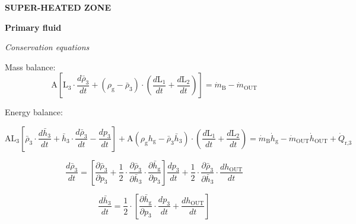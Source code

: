 \documentclass[11pt]{article} %
\begin{document}
\begin{center}
{\bf SUPER-HEATED ZONE}
\end{center}


{\bf Primary fluid}\\
\begin{center}
\textit{Conservation equations}\\
\end{center}
Mass balance:
\begin{equation}
\text{A} [\text{L}_\text{3}  \cdot \frac{d \bar{\rho}_\text{3}}{d t} + (\rho_\text{g} - \bar{\rho}_\text{3}) \cdot (\frac{d \text{L}_\text{1}}{d t} + \frac{d \text{L}_\text{2}}{d t})] = \dot{m}_\text{B} -  \dot{m}_\text{OUT}
\end{equation}
\begin{flushleft}
Energy balance:
\end{flushleft}
\begin{equation}
\text{A}\text{L}_\text{3}[\bar{\rho}_\text{3} \cdot \frac{d \bar{h}_\text{3}}{d t} + \bar{h}_\text{3} \cdot \frac{d \bar{\rho}_\text{3}}{d t}  -  \frac{d p_\text{3}}{d t}] + \text{A}(\rho_\text{g}h_\text{g} - \bar{\rho}_\text{3}\bar{h}_\text{3})\cdot (\frac{d \text{L}_\text{1}}{d t} + \frac{d \text{L}_\text{2}}{d t} ) = \dot{m}_\text{B}  \dot{h}_\text{g} -  \dot{m}_\text{OUT} \dot{h}_\text{OUT} + \dot{Q}_\text{r,3}
\end{equation}


\begin{equation}
\frac{d \bar{\rho}_\text{3}}{d t} = [ \frac{\partial \bar{\rho}_\text{3}}{\partial p_\text{3}} + \frac{1}{2} \cdot \frac{\partial \bar{\rho}_\text{3}}{\partial \bar{h}_\text{3}} \cdot \frac{\partial \bar{h}_\text{g}}{\partial p_\text{3}}] \frac{d p_\text{3}}{d t} + \frac{1}{2} \cdot \frac{\partial \bar{\rho}_\text{3}}{\partial \bar{h}_\text{3}}  \cdot \frac{d h_\text{OUT}}{d t}
\end{equation}


\begin{equation}
\frac{d \bar{h}_\text{3}}{d t} = \frac{1}{2} \cdot [\frac{\partial \bar{h}_\text{g}}{\partial p_\text{3}} \cdot \frac{d p_\text{3}}{d t} + \frac{d h_\text{OUT}}{d t}]
\end{equation}\\
\end{document}
